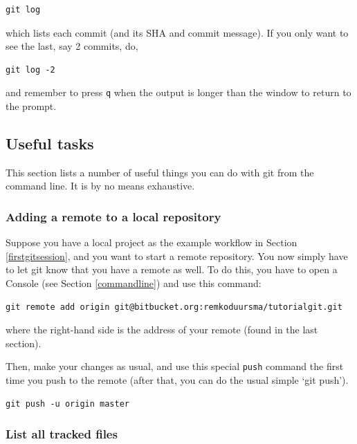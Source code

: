 \documentclass[]{book}
\begin{document}
\begin{verbatim}
git log
\end{verbatim}

which lists each commit (and its SHA and commit message). If you only want to see the last, say 2 commits, do,

\begin{verbatim}
git log -2
\end{verbatim}

and remember to press \texttt{q} when the output is longer than the window to return to the prompt.

\hypertarget{useful-tasks}{%
\subsection{Useful tasks}\label{useful-tasks}}

This section lists a number of useful things you can do with git from the command line. It is by no means exhaustive.

\hypertarget{adding-a-remote-to-a-local-repository}{%
\subsubsection{Adding a remote to a local repository}\label{adding-a-remote-to-a-local-repository}}

Suppose you have a local project as the example workflow in Section \ref{firstgitsession}, and you want to start a remote repository. You now simply have to let git know that you have a remote as well. To do this, you have to open a Console (see Section \ref{commandline}) and use this command:

\begin{verbatim}
git remote add origin git@bitbucket.org:remkoduursma/tutorialgit.git
\end{verbatim}

where the right-hand side is the address of your remote (found in the last section).

Then, make your changes as usual, and use this special \texttt{push} command the first time you push to the remote (after that, you can do the usual simple `git push').

\begin{verbatim}
git push -u origin master
\end{verbatim}

\hypertarget{list-all-tracked-files}{%
\subsubsection{List all tracked files}\label{list-all-tracked-files}}
\end{document}
